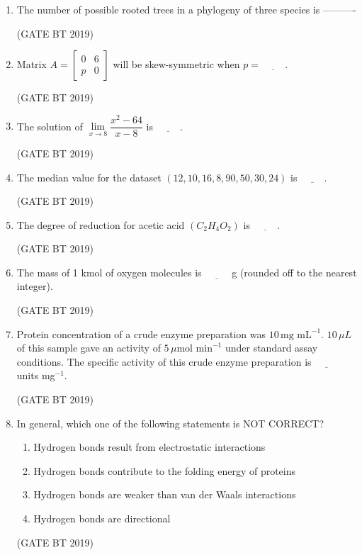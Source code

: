 \documentclass[journal,12pt,onecolumn]{IEEEtran}
\begin{document}
\begin{enumerate}
    \item The number of possible rooted trees in a phylogeny of three species is ----------

\hfill(GATE BT 2019)    

\item Matrix $A = \begin{bmatrix} 0 & 6 \\ p & 0 \end{bmatrix}$ will be skew-symmetric when $p = \underline{\hspace{1cm}}$.

\hfill(GATE BT 2019)

\item The solution of $\lim\limits_{x \to 8} \dfrac{x^2 - 64}{x - 8}$ is $\underline{\hspace{1cm}}$.

\hfill(GATE BT 2019)

\item The median value for the dataset $(12, 10, 16, 8, 90, 50, 30, 24)$ is $\underline{\hspace{1cm}}$.

\hfill(GATE BT 2019)

\item The degree of reduction for acetic acid $(C_2H_4O_2)$ is $\underline{\hspace{1cm}}$.

\hfill(GATE BT 2019)
\item The mass of 1 kmol of oxygen molecules is $\underline{\hspace{1cm}}$ g (rounded off to the nearest integer).

\hfill(GATE BT 2019)

\item Protein concentration of a crude enzyme preparation was $10 \, \text{mg mL}^{-1}$. 
$10 \, \mu L$ of this sample gave an activity of $5 \, \mu\text{mol min}^{-1}$ under standard assay conditions. 
The specific activity of this crude enzyme preparation is $\underline{\hspace{1cm}}$ units mg$^{-1}$.

\hfill(GATE BT 2019)

\item In general, which one of the following statements is NOT CORRECT?

\begin{enumerate}
\item Hydrogen bonds result from electrostatic interactions
\item Hydrogen bonds contribute to the folding energy of proteins
\item Hydrogen bonds are weaker than van der Waals interactions
\item Hydrogen bonds are directional
\end{enumerate}
\hfill(GATE BT 2019)


\end{enumerate}
\end{document}
